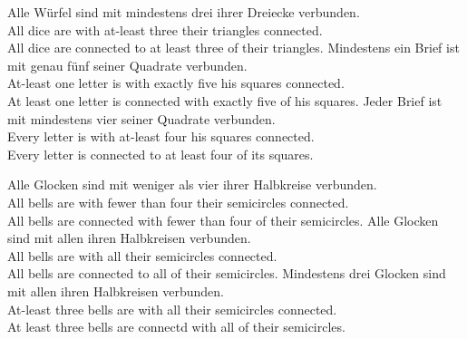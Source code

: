 \documentclass[fleqn,reqno,10pt,draft]{article}
\begin{document}
\begin{exe}
  \ex \label{bsp:controls-as}
    \begin{xlist}
\ex \label{bsp:controls-as-1} \gll Alle W\"urfel sind mit mindestens drei ihrer Dreiecke verbunden.\\
  All dice are with at-least three their triangles connected.\\
  \trans All dice are connected to at least three of their triangles.
\ex \label{bsp:controls-as-2} \gll Mindestens ein Brief ist mit genau f\"unf seiner Quadrate verbunden.\\
  At-least one letter is with exactly five his squares connected.\\
  \trans At least one letter is connected with exactly five of his squares.
\ex \label{bsp:controls-as-3} \gll Jeder Brief ist mit mindestens vier seiner Quadrate verbunden.\\
  Every letter is with at-least four his squares connected.\\
  \trans Every letter is connected to at least four of its squares.
\end{xlist}

\end{exe}



\begin{exe}
\ex \label{bsp:controls-es}
  \begin{xlist}
\ex \label{bsp:controls-es-1} \gll Alle Glocken sind mit weniger als vier ihrer Halbkreise verbunden. \\
All bells are with fewer than four their semicircles connected.\\
\trans All bells are connected with fewer than four of their semicircles.  
\ex \label{bsp:controls-es-2} \gll Alle Glocken sind mit allen ihren Halbkreisen verbunden.\\
All bells are with all their semicircles connected.\\
\trans All bells are connected to all of their semicircles. 
\ex \label{bsp:controls-es-3} \gll Mindestens drei Glocken sind mit allen ihren Halbkreisen verbunden.\\
  At-least three bells are with all  their semicircles connected.\\
  \trans At least three bells are connectd with all of their semicircles.
\end{xlist}

\end{exe}
\end{document}
